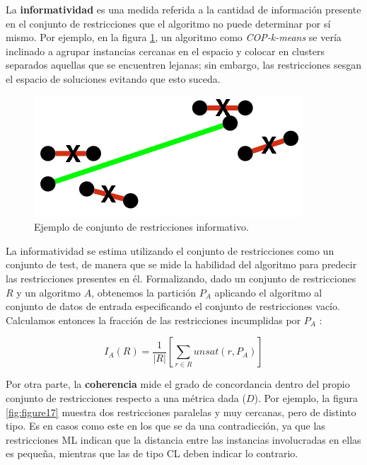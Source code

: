 La \textbf{informatividad} es una medida referida a la cantidad de información presente en el conjunto de restricciones que el algoritmo no puede determinar por sí mismo. Por ejemplo, en la figura \ref{fig:figure16}, un algoritmo como \textit{COP-k-means} se vería inclinado a agrupar instancias cercanas en el espacio y colocar en clusters separados aquellas que se encuentren lejanas; sin embargo, las restricciones sesgan el espacio de soluciones evitando que esto suceda. 

\begin{figure}[!h]
	\centering
	\includegraphics[scale=0.4]{imagenes/c3/Inform/Inform} 
	\caption[Ejemplo de conjunto de restricciones informativo.]{Ejemplo de conjunto de restricciones informativo. \cite{Survey:2007}}\label{fig:figure16}
\end{figure}


La informatividad se estima utilizando el conjunto de restricciones como un conjunto de test, de manera que se mide la habilidad del algoritmo para predecir las restricciones presentes en él. Formalizando, dado un conjunto de restricciones $R$ y un algoritmo $A$, obtenemos la partición $P_A$ aplicando el algoritmo al conjunto de datos de entrada especificando el conjunto de restricciones vacío. Calculamos entonces la fracción de las restricciones incumplidas por $P_A$ \cite{Survey:2007}:

\begin{equation}
I_A(R) = \frac{1}{|R|}\left[ \sum_{r \in R} unsat(r, P_A) \right] 
\end{equation}

\clearpage

Por otra parte, la \textbf{coherencia} mide el grado de concordancia dentro del propio conjunto de restricciones respecto a una métrica dada ($D$). Por ejemplo, la figura \ref{fig:figure17} muestra dos restricciones paralelas y muy cercanas, pero de distinto tipo. Es en casos como este en los que se da una contradicción, ya que las restricciones \acf{ML} indican que la distancia entre las instancias involucradas en ellas es pequeña, mientras que las de tipo \acf{CL} deben indicar lo contrario.

